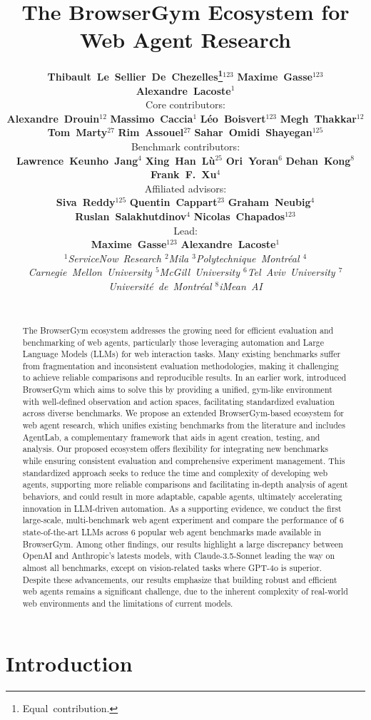 \documentclass[10pt]{article} %
\title{\centering The BrowserGym Ecosystem for Web Agent Research}
\author{
    \noindent
    {\centering
    \mbox{\bf Thibault Le Sellier De Chezelles\thanks{Equal contribution.}\hspace{1.5mm}$^{123}$}\:
    \mbox{\bf Maxime Gasse\footnotemark[1]\hspace{1.5mm}$^{123}$}\:
    \mbox{\bf Alexandre Lacoste\footnotemark[1]\hspace{1.5mm}$^{1}$}\\[5pt]
    }
    {\centering
    \textnormal{Core contributors:}\\
    \mbox{\bf Alexandre Drouin$^{12}$}\:
    \mbox{\bf Massimo Caccia$^1$}\:
    \mbox{\bf Léo Boisvert$^{123}$}\:
    \mbox{\bf Megh Thakkar$^{12}$}\:
    \mbox{\bf Tom Marty$^{27}$}\:
    \mbox{\bf Rim Assouel$^{27}$}\:
    \mbox{\bf Sahar Omidi Shayegan$^{125}$}\\[5pt]
    }
    {\centering
    \textnormal{Benchmark contributors:}\\
    \mbox{\bf Lawrence Keunho Jang$^{4}$}\:
    \mbox{\bf Xing Han Lù$^{25}$}\:
    \mbox{\bf Ori Yoran$^{6}$}\:
    \mbox{\bf Dehan Kong$^{8}$}\:
    \mbox{\bf Frank F. Xu$^{4}$}\\[5pt]
    }
    {\centering
    \textnormal{Affiliated advisors:}\\
    \mbox{\bf Siva Reddy$^{125}$}\:
    \mbox{\bf Quentin Cappart$^{23}$}\:
    \mbox{\bf Graham Neubig$^{4}$}\:
    \mbox{\bf Ruslan Salakhutdinov$^{4}$}\:
    \mbox{\bf Nicolas Chapados$^{123}$}\\[5pt]
    }
    {\centering
    \textnormal{Lead:}\\
    \mbox{\bf Maxime Gasse$^{123}$}\:
    \mbox{\bf Alexandre Lacoste$^{1}$}\\[5pt]
    }
    {\centering
    \it
    \mbox{$^1$ServiceNow Research} \mbox{$^2$Mila} \mbox{$^3$Polytechnique Montréal} \mbox{$^4$Carnegie Mellon University} \mbox{$^5$McGill University} \mbox{$^6$Tel Aviv University} \mbox{$^7$Université de Montréal} \mbox{$^8$iMean~AI}\\~
    }
}
\begin{document}
\maketitle

\begin{abstract}
The BrowserGym ecosystem addresses the growing need for efficient evaluation and benchmarking of web agents, particularly those leveraging automation and Large Language Models (LLMs) for web interaction tasks. Many existing benchmarks suffer from fragmentation and inconsistent evaluation methodologies, making it challenging to achieve reliable comparisons and reproducible results. In an earlier work, \citet{workarena} introduced BrowserGym which aims to solve this by providing a unified, gym-like environment with well-defined observation and action spaces, facilitating standardized evaluation across diverse benchmarks. We propose an extended BrowserGym-based ecosystem for web agent research, which unifies existing benchmarks from the literature and includes AgentLab, a complementary framework that aids in agent creation, testing, and analysis. Our proposed ecosystem offers flexibility for integrating new benchmarks while ensuring consistent evaluation and comprehensive experiment management. This standardized approach seeks to reduce the time and complexity of developing web agents, supporting more reliable comparisons and facilitating in-depth analysis of agent behaviors, and could result in more adaptable, capable agents, ultimately accelerating innovation in LLM-driven automation. As a supporting evidence, we conduct the first large-scale, multi-benchmark web agent experiment and compare the performance of 6 state-of-the-art LLMs across 6 popular web agent benchmarks made available in BrowserGym. Among other findings, our results highlight a large discrepancy between OpenAI and Anthropic's latests models, with Claude-3.5-Sonnet leading the way on almost all benchmarks, except on vision-related tasks where GPT-4o is superior. Despite these advancements, our results emphasize that building robust and efficient web agents remains a significant challenge, due to the inherent complexity of real-world web environments and the limitations of current models.
\end{abstract}



\section{Introduction}
\end{document}
